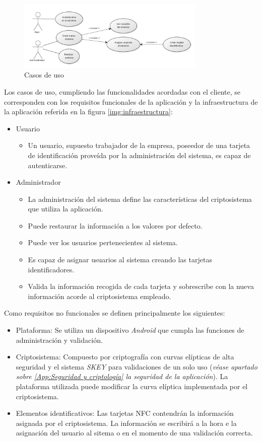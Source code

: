 \documentclass[../PFC.tex]{subfiles}
\begin{document}
\begin{figure}[H]
  \centering
  \includegraphics[width=0.8\textwidth]{./img/usecase1}
  \caption{Casos de uso}
  \label{img:usecase1}
\end{figure}

Los casos de uso, cumpliendo las funcionalidades acordadas con el cliente, se corresponden con los requisitos funcionales de la aplicación y la infraestructura de la aplicación referida en la figura \ref{img:infraestructura}:

\begin{itemize}
\item{Usuario}
	\begin{itemize}
	\item{Un usuario, supuesto trabajador de la empresa, poseedor de una tarjeta de identificación proveída por la administración del sistema, es capaz de autenticarse.}
	\end{itemize}
\item{Administrador}
	\begin{itemize}
	\item{La administración del sistema define las características del criptosistema que utiliza la aplicación.}
	\item{Puede restaurar la información a los valores por defecto.}
	\item{Puede ver los usuarios pertenecientes al sistema.}
	\item{Es capaz de asignar usuarios al sistema creando las tarjetas identificadores.}
	\item{Valida la información recogida de cada tarjeta y sobrescribe con la nueva información acorde al criptosistema empleado.}
	\end{itemize}
\end{itemize}

Como requisitos no funcionales se definen principalmente los siguientes:

\begin{itemize}
\item{Plataforma: Se utiliza un dispositivo \textit{Android} que cumpla las funciones de administración y validación.}
\item{Criptosistema: Compuesto por criptografía con curvas elípticas de alta seguridad y el sistema \textit{SKEY} para validaciones de un solo uso (\textit{véase apartado sobre \ref{App:Seguridad y criptología} la seguridad de la aplicación}). La plataforma utilizada puede modificar la curva elíptica implementada por el criptosistema.}
\item{Elementos identificativos: Las tarjetas NFC contendrán la información asignada por el criptosistema. La información se escribirá a la hora e la asignación del usuario al sitema o en el momento de una validación correcta.}
\end{itemize}
\end{document}
